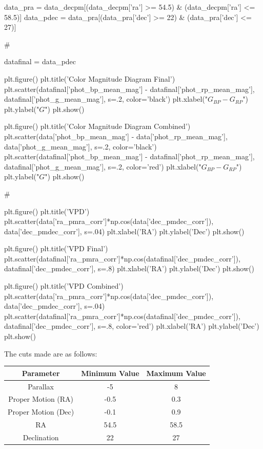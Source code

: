 \documentclass{article}
\begin{document}
\begin{python}
    data_pra = data_decpm[(data_decpm['ra'] >= 54.5) & (data_decpm['ra'] <= 58.5)]
    data_pdec = data_pra[(data_pra['dec'] >= 22) & (data_pra['dec'] <= 27)]

    #%

    datafinal = data_pdec

    plt.figure()
    plt.title('Color Magnitude Diagram Final')
    plt.scatter(datafinal['phot_bp_mean_mag'] - datafinal['phot_rp_mean_mag'], datafinal['phot_g_mean_mag'], s=.2, color='black')
    plt.xlabel("$G_{BP} - G_{RP}$")
    plt.ylabel("$G$")
    plt.show()

    plt.figure()
    plt.title('Color Magnitude Diagram Combined')
    plt.scatter(data['phot_bp_mean_mag'] - data['phot_rp_mean_mag'], data['phot_g_mean_mag'], s=.2, color='black')
    plt.scatter(datafinal['phot_bp_mean_mag'] - datafinal['phot_rp_mean_mag'], datafinal['phot_g_mean_mag'], s=.2, color='red')
    plt.xlabel("$G_{BP} - G_{RP}$")
    plt.ylabel("$G$")
    plt.show()


    #%

    plt.figure()
    plt.title('VPD')
    plt.scatter(data['ra_pmra_corr']*np.cos(data['dec_pmdec_corr']), data['dec_pmdec_corr'], s=.04)
    plt.xlabel('RA')
    plt.ylabel('Dec')
    plt.show()

    plt.figure()
    plt.title('VPD Final')
    plt.scatter(datafinal['ra_pmra_corr']*np.cos(datafinal['dec_pmdec_corr']), datafinal['dec_pmdec_corr'], s=.8)
    plt.xlabel('RA')
    plt.ylabel('Dec')
    plt.show()

    plt.figure()
    plt.title('VPD Combined')
    plt.scatter(data['ra_pmra_corr']*np.cos(data['dec_pmdec_corr']), data['dec_pmdec_corr'], s=.04)
    plt.scatter(datafinal['ra_pmra_corr']*np.cos(datafinal['dec_pmdec_corr']), datafinal['dec_pmdec_corr'], s=.8, color='red')
    plt.xlabel('RA')
    plt.ylabel('Dec')
    plt.show()

\end{python}

The cuts made are as follows:

\begin{center}
    \begin{tabular}{| c | c | c |}
        \hline
        Parameter & Minimum Value & Maximum Value \\
        \hline
        Parallax & -5 & 8\\
        Proper Motion (RA) & -0.5 & 0.3\\
        Proper Motion (Dec) & -0.1 & 0.9\\
        RA & 54.5 & 58.5\\
        Declination & 22 & 27\\
        \hline
    \end{tabular}
\end{center}
\end{document}
